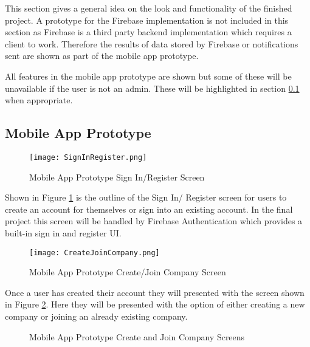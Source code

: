 This section gives a general idea on the look and functionality of the finished project. A prototype for the Firebase implementation is not included in this section as Firebase is a third party backend implementation which requires a client to work. Therefore the results of data stored by Firebase or notifications sent are shown as part of the mobile app prototype. 

All features in the mobile app prototype are shown but some of these will be unavailable if the user is not an admin. These will be highlighted in section \ref{section:mobileappprototype} when appropriate.

\subsection{Mobile App Prototype}
\label{section:mobileappprototype}

\begin{figure}[ht]
  \centering
      \texttt{[image: SignInRegister.png]}
  \caption[Mobile App Prototype Sign In/Register Screen]{Mobile App Prototype Sign In/Register Screen}
  \label{fig:signInRegister}
\end{figure}

Shown in Figure \ref{fig:signInRegister} is the outline of the Sign In/ Register screen for users to create an account for themselves or sign into an existing account. In the final project this screen will be handled by Firebase Authentication which provides a built-in sign in and register UI.

\clearpage
\begin{figure}[ht]
  \centering
      \texttt{[image: CreateJoinCompany.png]}
  \caption[Mobile App Prototype Create/Join Company Screen]{Mobile App Prototype Create/Join Company Screen}
  \label{fig:CreateJoinCompany}
\end{figure}

Once a user has created their account they will presented with the screen shown in Figure \ref{fig:CreateJoinCompany}. Here they will be presented with the option of either creating a new company or joining an already existing company.

\clearpage
\begin{figure}
\centering     %
{}
\caption{Mobile App Prototype Create and Join Company Screens}
\label{fig:CreateAndJoinCompanyScreens}
\end{figure}

